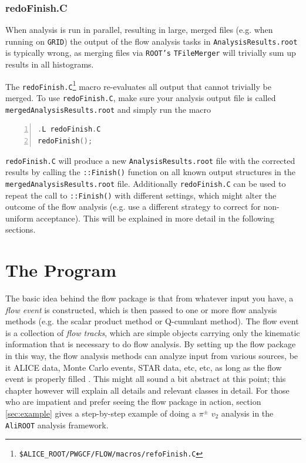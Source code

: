 \documentclass[a4paper]{book}
\numberwithin{equation}{subsection}
\begin{document}
\subsection{redoFinish.C}
 When analysis is run in parallel, resulting in large, merged files (e.g. when running on \texttt{GRID}) the output of the flow analysis tasks in \texttt{AnalysisResults.root} is typically wrong, as merging files via \texttt{ROOT's} \texttt{TFileMerger} will trivially sum up results in all histograms. 

The \texttt{redoFinish.C}\footnote{\texttt{\$ALICE\_ROOT/PWGCF/FLOW/macros/refoFinish.C}} macro re-evaluates all output that cannot trivially be merged. To use \texttt{redoFinish.C}, make sure your analysis output file is called \texttt{mergedAnalysisResults.root} and simply run the macro
\begin{lstlisting}[language=C, numbers=left]
.L redoFinish.C
redoFinish(); \end{lstlisting}
\texttt{redoFinish.C} will produce a new \texttt{AnalysisResults.root} file with the corrected results by calling the \texttt{::Finish()} function on all known output structures in the \texttt{mergedAnalysisResults.root} file. Additionally \texttt{redoFinish.C} can be used to repeat the call to \texttt{::Finish()} with different settings, which might alter the outcome of the flow analysis (e.g. use a different strategy to correct for non-uniform acceptance). This will be explained in more detail in the following sections. 

\chapter{The Program}
The basic idea behind the flow package is that from whatever input you have, a \emph{flow event} is constructed, which is then passed to one or more flow analysis methods (e.g. the scalar product method or Q-cumulant method). The flow event is a collection of \emph{flow tracks}, which are simple objects carrying only the kinematic information that is necessary to do flow analysis. By setting up the flow package in this way, the flow analysis methods can analyze input from various sources, be it ALICE data, Monte Carlo events, STAR data, etc, etc, as long as the flow event is properly filled . This might all sound a bit abstract at this point; this chapter however will explain all details and relevant classes in detail. For those who are impatient and prefer seeing the flow package in action, section \ref{sec:example} gives a step-by-step example of doing a $\pi^{\pm}$ $v_2$ analysis in the \texttt{AliROOT} analysis framework. 
\end{document}
